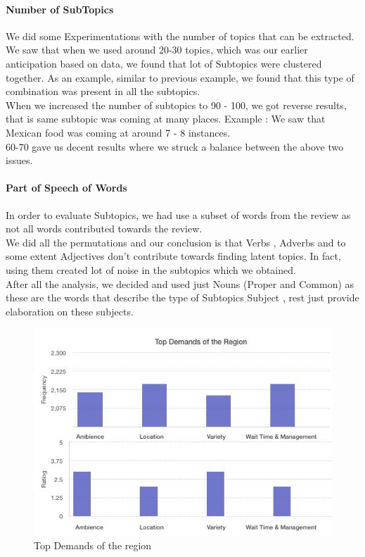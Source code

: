 \documentclass[12pt]{article} %
\begin{document}
\begin{itemize}
\paragraph{Number of SubTopics}
We did some Experimentations with the number of topics that can be extracted. We saw that when we used around 20-30 topics, which was our earlier anticipation based on data, we found that lot of Subtopics were clustered together. As an example, similar to previous example, we found that this type of combination was present in all the subtopics. \\
When we increased the number of subtopics to 90 - 100, we got reverse results, that is same subtopic was coming at many places. Example : We saw that Mexican food was coming at around 7 - 8 instances. \\
60-70 gave us decent results where we struck a balance between the above two issues.\\ [.15cm]

\paragraph {Part of Speech of Words}
In order to evaluate Subtopics, we had use a subset of words from the review as not all words contributed towards the review. \\
We did  all the permutations and our conclusion is that Verbs , Adverbs and to some extent Adjectives don't contribute towards finding latent topics. In fact, using them created lot of noise in the subtopics which we obtained. \\
After all the analysis, we decided and used just Nouns (Proper and Common) as these are the words that describe the type of Subtopics {Subject} , rest just provide elaboration on these subjects.\\

\end{itemize}

\begin{figure}[h]
\begin{center}
\includegraphics[width=5in]{eval.jpg}
\caption{Top Demands of the region}
\end{center}
\end{figure}
\end{document}
